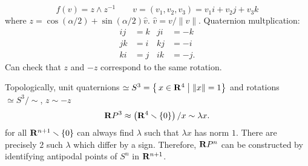\begin{example}
\[
f(v)=z\wedge z^{-1}\qquad
v=(v_1,v_2,v_3)=v_1i+v_2j+v_3k
\]
where $z=\cos(\alpha/2)+\sin(\alpha/2)\hat v$. $\hat v=v/\|v\|$. Quaternion
multplication:
\begin{align*}
ij&=k&ji&=-k\\
jk&=i&kj&=-i\\
ki&=j&ik&=-j.
\end{align*}
Can check that $z$ and $-z$ correspond to the same rotation.

Topologically, unit quaternions $\simeq
S^3=\left\{\,x\in\mathbf{R}^4\;\middle|\;\|x\|=1\right\}$ and rotations $\simeq
S^3/{\sim}$, $z\sim -z$
\[
\bfRP^3\approx\left(\bfR^4\minus\{0\}\right)/x\sim\lambda x.
\]
for all $\bfR^{n+1}\minus\{0\}$ can always find $\lambda$ such that
$\lambda x$ has norm $1$. There are precisely $2$ such $\lambda$ which
differ by a sign. Therefore, $\mathbf{R}P^n$ can be constructed by identifying
antipodal points of $S^n$ in $\mathbf{R}^{n+1}$.
\end{example}


